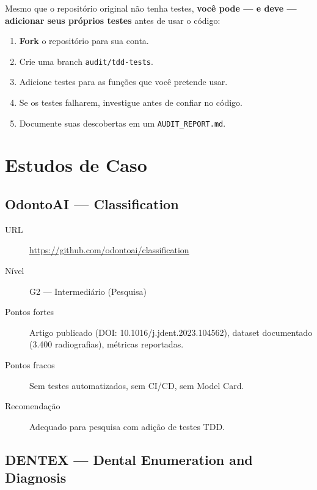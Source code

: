 Mesmo que o repositório original não tenha testes, \textbf{você pode —
e deve — adicionar seus próprios testes} antes de usar o código:

\begin{enumerate}
  \item \textbf{Fork} o repositório para sua conta.
  \item Crie uma branch \texttt{audit/tdd-tests}.
  \item Adicione testes para as funções que você pretende usar.
  \item Se os testes falharem, investigue antes de confiar no código.
  \item Documente suas descobertas em um \texttt{AUDIT\_REPORT.md}.
\end{enumerate}


\section{Estudos de Caso}

\subsection{OdontoAI — Classification}

\begin{description}
  \item[URL] \url{https://github.com/odontoai/classification}
  \item[Nível] G2 — Intermediário (Pesquisa)
  \item[Pontos fortes] Artigo publicado (DOI: 10.1016/j.jdent.2023.104562),
    dataset documentado (3.400 radiografias), métricas reportadas.
  \item[Pontos fracos] Sem testes automatizados, sem CI/CD, sem Model Card.
  \item[Recomendação] Adequado para pesquisa com adição de testes TDD.
\end{description}

\subsection{DENTEX — Dental Enumeration and Diagnosis}

